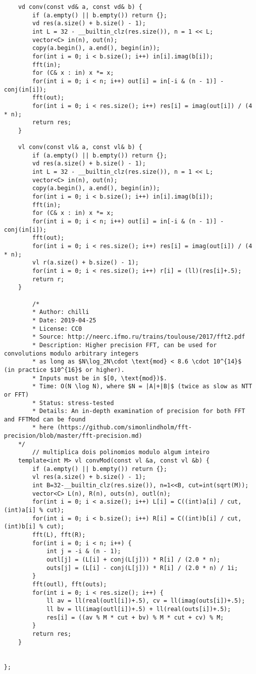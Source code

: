 \documentclass[11pt, a4paper, twoside]{article}
\begin{document}
\begin{verbatim}
    vd conv(const vd& a, const vd& b) {
        if (a.empty() || b.empty()) return {};
        vd res(a.size() + b.size() - 1);
        int L = 32 - __builtin_clz(res.size()), n = 1 << L;
        vector<C> in(n), out(n);
        copy(a.begin(), a.end(), begin(in));
        for(int i = 0; i < b.size(); i++) in[i].imag(b[i]);
        fft(in);
        for (C& x : in) x *= x;
        for(int i = 0; i < n; i++) out[i] = in[-i & (n - 1)] - conj(in[i]);
        fft(out);
        for(int i = 0; i < res.size(); i++) res[i] = imag(out[i]) / (4 * n);
        return res;
    }
    
    vl conv(const vl& a, const vl& b) {
        if (a.empty() || b.empty()) return {};
        vd res(a.size() + b.size() - 1);
        int L = 32 - __builtin_clz(res.size()), n = 1 << L;
        vector<C> in(n), out(n);
        copy(a.begin(), a.end(), begin(in));
        for(int i = 0; i < b.size(); i++) in[i].imag(b[i]);
        fft(in);
        for (C& x : in) x *= x;
        for(int i = 0; i < n; i++) out[i] = in[-i & (n - 1)] - conj(in[i]);
        fft(out);
        for(int i = 0; i < res.size(); i++) res[i] = imag(out[i]) / (4 * n);
        vl r(a.size() + b.size() - 1);
        for(int i = 0; i < res.size(); i++) r[i] = (ll)(res[i]+.5);
        return r;
    }
     
        /*
        * Author: chilli
        * Date: 2019-04-25
        * License: CC0
        * Source: http://neerc.ifmo.ru/trains/toulouse/2017/fft2.pdf
        * Description: Higher precision FFT, can be used for convolutions modulo arbitrary integers
        * as long as $N\log_2N\cdot \text{mod} < 8.6 \cdot 10^{14}$ (in practice $10^{16}$ or higher).
        * Inputs must be in $[0, \text{mod})$.
        * Time: O(N \log N), where $N = |A|+|B|$ (twice as slow as NTT or FFT)
        * Status: stress-tested
        * Details: An in-depth examination of precision for both FFT and FFTMod can be found
        * here (https://github.com/simonlindholm/fft-precision/blob/master/fft-precision.md)
    */
        // multiplica dois polinomios modulo algum inteiro
    template<int M> vl convMod(const vl &a, const vl &b) {
        if (a.empty() || b.empty()) return {};
        vl res(a.size() + b.size() - 1);
        int B=32-__builtin_clz(res.size()), n=1<<B, cut=int(sqrt(M));
        vector<C> L(n), R(n), outs(n), outl(n);
        for(int i = 0; i < a.size(); i++) L[i] = C((int)a[i] / cut, (int)a[i] % cut);
        for(int i = 0; i < b.size(); i++) R[i] = C((int)b[i] / cut, (int)b[i] % cut);
        fft(L), fft(R);
        for(int i = 0; i < n; i++) {
            int j = -i & (n - 1);
            outl[j] = (L[i] + conj(L[j])) * R[i] / (2.0 * n);
            outs[j] = (L[i] - conj(L[j])) * R[i] / (2.0 * n) / 1i;
        }
        fft(outl), fft(outs);
        for(int i = 0; i < res.size(); i++) {
            ll av = ll(real(outl[i])+.5), cv = ll(imag(outs[i])+.5);
            ll bv = ll(imag(outl[i])+.5) + ll(real(outs[i])+.5);
            res[i] = ((av % M * cut + bv) % M * cut + cv) % M;
        }
        return res;
    }
     
    
};
\end{verbatim}
\end{document}
